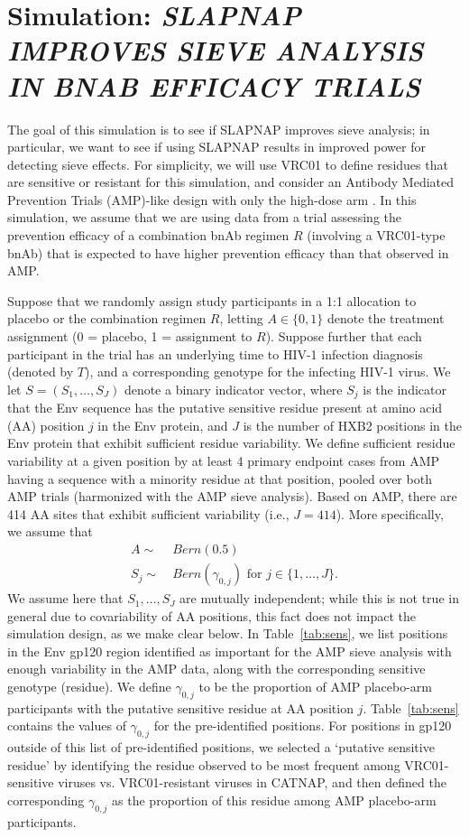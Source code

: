 \documentclass[10pt]{article}
\begin{document}
\section{Simulation: \textit{SLAPNAP IMPROVES SIEVE ANALYSIS IN BNAB EFFICACY TRIALS}}

The goal of this simulation is to see if SLAPNAP improves sieve analysis; in particular, we want to see if using SLAPNAP results in improved power for detecting sieve effects. For simplicity, we will use VRC01 to define residues that are sensitive or resistant for this simulation, and consider an Antibody Mediated Prevention Trials (AMP)-like design with only the high-dose arm \citep{corey2021}. In this simulation, we assume that we are using data from a trial assessing the prevention efficacy of a combination bnAb regimen $R$ (involving a VRC01-type bnAb) that is expected to have higher prevention efficacy than that observed in AMP.

Suppose that we randomly assign study participants in a 1:1 allocation to placebo or the combination regimen $R$, letting $A \in \{0,1\}$ denote the treatment assignment (0 = placebo, 1 = assignment to $R$). Suppose further that each participant in the trial has an underlying time to HIV-1 infection diagnosis (denoted by $T$), and a corresponding genotype for the infecting HIV-1 virus. We let $S = (S_1, \ldots, S_J)$ denote a binary indicator vector, where $S_j$ is the indicator that the Env sequence has the putative sensitive residue present at amino acid (AA) position $j$ in the Env protein, and $J$ is the number of HXB2 positions in the Env protein that exhibit sufficient residue variability. We define sufficient residue variability at a given position by at least 4 primary endpoint cases from AMP having a sequence with a minority residue at that position, pooled over both AMP trials (harmonized with the AMP sieve analysis). Based on AMP, there are 414 AA sites that exhibit sufficient variability (i.e., $J = 414$). More specifically, we assume that
\begin{align*}
  A \sim & \ Bern(0.5) \\
  S_j \sim & \ Bern(\gamma_{0,j}) \text{ for } j \in \{1, \ldots, J\}.
\end{align*}
We assume here that $S_1, \ldots, S_J$ are mutually independent; while this is not true in general due to covariability of AA positions, this fact does not impact the simulation design, as we make clear below. In Table~\ref{tab:sens}, we list positions in the Env gp120 region identified as important for the AMP sieve analysis with enough variability in the AMP data, along with the corresponding sensitive genotype (residue). We define $\gamma_{0,j}$ to be the proportion of AMP placebo-arm participants with the putative sensitive residue at AA position $j$. Table~\ref{tab:sens} contains the values of $\gamma_{0,j}$ for the pre-identified positions. For positions in gp120 outside of this list of pre-identified positions, we selected a `putative sensitive residue' by identifying the residue observed to be most frequent among VRC01-sensitive viruses vs. VRC01-resistant viruses in CATNAP, and then defined the corresponding $\gamma_{0,j}$ as the proportion of this residue among AMP placebo-arm participants.
\end{document}
